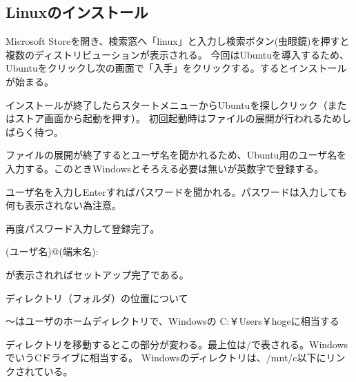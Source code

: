 \documentclass[autodetect-engine,dvipdfmx-if-dvi,ja=standard,a4j]{bxjsarticle}
\begin{document}
		\subsection{Linuxのインストール}
			Microsoft Storeを開き、検索窓へ「linux」と入力し検索ボタン(虫眼鏡)を押すと複数のディストリビューションが表示される。
			今回はUbuntuを導入するため、Ubuntuをクリックし次の画面で「入手」をクリックする。するとインストールが始まる。\par
			インストールが終了したらスタートメニューからUbuntuを探しクリック（またはストア画面から起動を押す）。
			初回起動時はファイルの展開が行われるためしばらく待つ。\par\noindent
			ファイルの展開が終了するとユーザ名を聞かれるため、Ubuntu用のユーザ名を入力する。このときWindowsとそろえる必要は無いが英数字で登録する。\par\noindent
			ユーザ名を入力しEnterすればパスワードを聞かれる。パスワードは入力しても何も表示されない為注意。\par\noindent
			再度パスワード入力して登録完了。\par
			(ユーザ名)@(端末名):~\par
			が表示されればセットアップ完了である。\par
			ディレクトリ（フォルダ）の位置について\par
			～はユーザのホームディレクトリで、Windowsの C:￥Users￥hogeに相当する\par
			ディレクトリを移動するとこの部分が変わる。最上位は/で表される。WindowsでいうCドライブに相当する。
Windowsのディレクトリは、/mnt/c以下にリンクされている。
\end{document}
